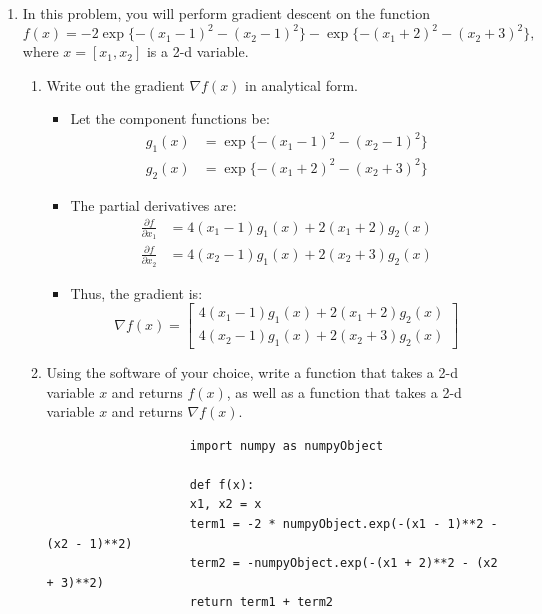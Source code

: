 \documentclass[11pt]{article}
\begin{document}
	\begin{enumerate}
		\item In this problem, you will perform gradient descent on the function
		\[
		f(x) = -2\exp\{-(x_1 - 1)^2 - (x_2 - 1)^2\} - \exp\{-(x_1 + 2)^2 - (x_2 + 3)^2\},
		\]
		where $x = [x_1, x_2]$ is a 2-d variable.
		
		\begin{enumerate}
			\item Write out the gradient $\nabla f(x)$ in analytical form.
			\begin{itemize}
				\item Let the component functions be:
				\begin{align*}
					g_1(x) &= \exp\{-(x_1 - 1)^2 - (x_2 - 1)^2\} \\
					g_2(x) &= \exp\{-(x_1 + 2)^2 - (x_2 + 3)^2\}
				\end{align*}
				
				\item The partial derivatives are:
				\begin{align*}
					\frac{\partial f}{\partial x_1} &= 4(x_1 - 1)g_1(x) + 2(x_1 + 2)g_2(x) \\
					\frac{\partial f}{\partial x_2} &= 4(x_2 - 1)g_1(x) + 2(x_2 + 3)g_2(x)
				\end{align*}
				
				\item Thus, the gradient is:
				\[
				\nabla f(x) = \begin{bmatrix} 
					4(x_1 - 1)g_1(x) + 2(x_1 + 2)g_2(x) \\ 
					4(x_2 - 1)g_1(x) + 2(x_2 + 3)g_2(x) 
				\end{bmatrix}
				\]
			\end{itemize}
		\vspace{5cm}
		\item Using the software of your choice, write a function that takes a 2-d variable $x$ and returns $f(x)$, as well as a function that takes a 2-d variable $x$ and returns $\nabla f(x)$.
			\begin{center}
			\begin{minipage}{0.8\textwidth} %
				\begin{verbatim}
					import numpy as numpyObject
					
					def f(x):
					x1, x2 = x
					term1 = -2 * numpyObject.exp(-(x1 - 1)**2 - (x2 - 1)**2)
					term2 = -numpyObject.exp(-(x1 + 2)**2 - (x2 + 3)**2)
					return term1 + term2
					

\end{verbatim}
\end{minipage}
\end{center}
\end{enumerate}
\end{enumerate}
\end{document}
